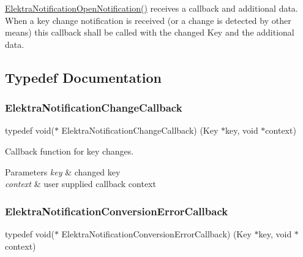 \hyperlink{kdbnotificationinternal_8h_adf7cf73a2740a3852b73d607b911a254}{Elektra\+Notification\+Open\+Notification()} receives a callback and additional data. When a key change notification is received (or a change is detected by other means) this callback shall be called with the changed Key and the additional data. 

\subsection{Typedef Documentation}
\mbox{\label{group__kdbnotification_gad0d800e32a72d89780321e5723301eb9}} 
\subsubsection{\texorpdfstring{Elektra\+Notification\+Change\+Callback}{ElektraNotificationChangeCallback}}
{\footnotesize\ttfamily typedef void($\ast$ Elektra\+Notification\+Change\+Callback) (Key $\ast$key, void $\ast$context)}



Callback function for key changes. 


\begin{DoxyParams}{Parameters}
{\em key} & changed key \\
\hline
{\em context} & user supplied callback context \\
\hline
\end{DoxyParams}
\mbox{\label{group__kdbnotification_gaad19fb981cad906eb9c72bd602c7bb64}} 
\subsubsection{\texorpdfstring{Elektra\+Notification\+Conversion\+Error\+Callback}{ElektraNotificationConversionErrorCallback}}
{\footnotesize\ttfamily typedef void($\ast$ Elektra\+Notification\+Conversion\+Error\+Callback) (Key $\ast$key, void $\ast$context)}



